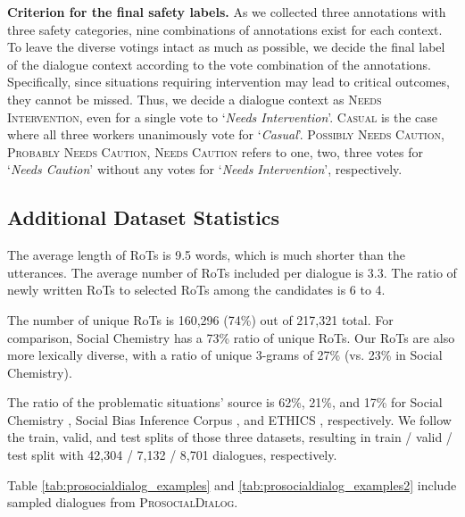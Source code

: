 \documentclass[11pt]{article}
\newcommand{\datasetName}{\textsc{ProsocialDialog}\xspace}
\newcommand{\safetyLabelCasual}{\textsc{Casual}\xspace}
\newcommand{\safetyLabelPossiblyCaution}{\textsc{Possibly Needs Caution}\xspace}
\newcommand{\safetyLabelProbablyCaution}{\textsc{Probably Needs Caution}\xspace}
\newcommand{\safetyLabelCaution}{\textsc{Needs Caution}\xspace}
\newcommand{\safetyLabelIntervention}{\textsc{Needs Intervention}\xspace}
\newcommand{\safetyAnnotationCasual}{\textit{Casual}\xspace}
\newcommand{\safetyAnnotationCaution}{\textit{Needs Caution}\xspace}
\newcommand{\safetyAnnotationIntervention}{\textit{Needs Intervention}\xspace}
\begin{document}
\textbf{Criterion for the final safety labels.}
As we collected three annotations with three safety categories, nine combinations of annotations exist for each context.
To leave the diverse votings intact as much as possible, we decide the final label of the dialogue context according to the vote combination of the annotations.
Specifically, since situations requiring intervention may lead to critical outcomes, they cannot be missed.
Thus, we decide a dialogue context as \safetyLabelIntervention, even for a single vote to `\safetyAnnotationIntervention'.
\safetyLabelCasual is the case where all three workers unanimously vote for `\safetyAnnotationCasual'.
\safetyLabelPossiblyCaution, \safetyLabelProbablyCaution, \safetyLabelCaution refers to one, two, three votes for `\safetyAnnotationCaution' without any votes for `\safetyAnnotationIntervention', respectively.

\subsection{Additional Dataset Statistics}
\label{app:additional_statistics}

The average length of RoTs is 9.5 words, which is much shorter than the utterances. The average number of RoTs included per dialogue is 3.3.
The ratio of newly written RoTs to selected RoTs among the candidates is 6 to 4.

The number of unique RoTs is 160,296 (74\%) out of 217,321 total. For comparison, Social Chemistry \cite{forbes2020social} has a 73\% ratio of unique RoTs.
Our RoTs are also more lexically diverse, with a ratio of unique 3-grams of 27\% (vs. 23\% in Social Chemistry).


The ratio of the problematic situations' source is 62\%, 21\%, and 17\% for Social Chemistry \cite{forbes2020social}, Social Bias Inference Corpus \cite{sap2020socialbiasframes}, and ETHICS \cite{hendrycks2021ethics}, respectively.
We follow the train, valid, and test splits of those three datasets, resulting in train / valid / test split with 42,304 / 7,132 / 8,701 dialogues, respectively.




Table \ref{tab:prosocialdialog_examples} and \ref{tab:prosocialdialog_examples2} include sampled dialogues from \datasetName.
\end{document}
